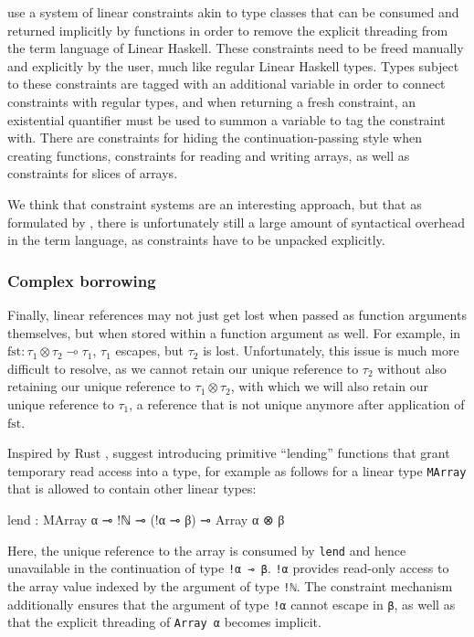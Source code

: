 \cite{spiwack_linearly_2022} use a system of linear constraints akin to type classes that can be consumed and returned implicitly by functions in order to remove the explicit threading from the term language of Linear Haskell. These constraints need to be freed manually and explicitly by the user, much like regular Linear Haskell types. Types subject to these constraints are tagged with an additional variable in order to connect constraints with regular types, and when returning a fresh constraint, an existential quantifier must be used to summon a variable to tag the constraint with. There are constraints for hiding the continuation-passing style when creating functions, constraints for reading and writing arrays, as well as constraints for slices of arrays.

We think that constraint systems are an interesting approach, but that as formulated by \cite{spiwack_linearly_2022}, there is unfortunately still a large amount of syntactical overhead in the term language, as constraints have to be unpacked explicitly.

\subsubsection{Complex borrowing}
Finally, linear references may not just get lost when passed as function arguments themselves, but when stored within a function argument as well. For example, in $\mathrm{fst} : \tau_1 \otimes \tau_2 \multimap \tau_1$, $\tau_1$ escapes, but $\tau_2$ is lost. Unfortunately, this issue is much more difficult to resolve, as we cannot retain our unique reference to $\tau_2$ without also retaining our unique reference to $\tau_1 \otimes \tau_2$, with which we will also retain our unique reference to $\tau_1$, a reference that is not unique anymore after application of $\mathrm{fst}$. 

Inspired by Rust \citep{weiss_oxide_2021}, \cite{spiwack_linearly_2022} suggest introducing primitive ``lending'' functions that grant temporary read access into a type, for example as follows for a linear type \lstinline|MArray| that is allowed to contain other linear types:\\
\begin{code}
lend : MArray α ⊸ !ℕ ⊸ (!α ⊸ β) ⊸ Array α ⊗ β
\end{code}

Here, the unique reference to the array is consumed by \lstinline|lend| and hence unavailable in the continuation of type \lstinline|!α ⊸ β|. \lstinline|!α| provides read-only access to the array value indexed by the argument of type \lstinline|!ℕ|. The constraint mechanism additionally ensures that the argument of type \lstinline|!α| cannot escape in \lstinline|β|, as well as that the explicit threading of \lstinline|Array α| becomes implicit.

